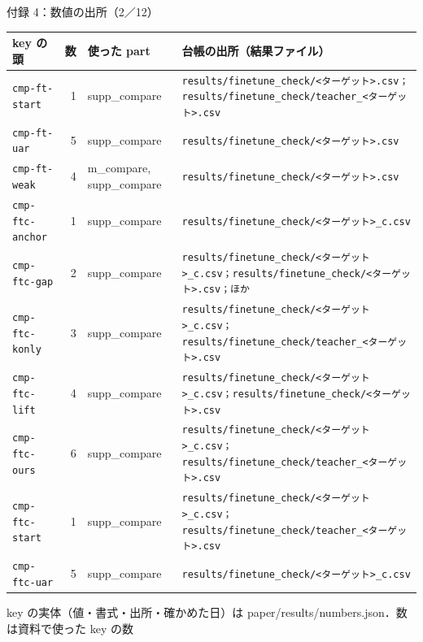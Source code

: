\begin{frame}{付録 4：数値の出所（2／12）}
  \vspace{-0.3em}\centering\tiny\renewcommand{\arraystretch}{1.0}
  \begin{tabularx}{\textwidth}{@{}l r l X@{}}
    \toprule key の頭 & 数 & 使った part & 台帳の出所（結果ファイル） \\ \midrule
    \texttt{cmp-ft-start} & 1 & supp\_compare & \texttt{results/\allowbreak{}finetune\_\allowbreak{}check/\allowbreak{}<ターゲット>.csv；results/\allowbreak{}finetune\_\allowbreak{}check/\allowbreak{}teacher\_\allowbreak{}<ターゲット>.csv} \\
    \texttt{cmp-ft-uar} & 5 & supp\_compare & \texttt{results/\allowbreak{}finetune\_\allowbreak{}check/\allowbreak{}<ターゲット>.csv} \\
    \texttt{cmp-ft-weak} & 4 & m\_compare, supp\_compare & \texttt{results/\allowbreak{}finetune\_\allowbreak{}check/\allowbreak{}<ターゲット>.csv} \\
    \texttt{cmp-ftc-anchor} & 1 & supp\_compare & \texttt{results/\allowbreak{}finetune\_\allowbreak{}check/\allowbreak{}<ターゲット>\_\allowbreak{}c.csv} \\
    \texttt{cmp-ftc-gap} & 2 & supp\_compare & \texttt{results/\allowbreak{}finetune\_\allowbreak{}check/\allowbreak{}<ターゲット>\_\allowbreak{}c.csv；results/\allowbreak{}finetune\_\allowbreak{}check/\allowbreak{}<ターゲット>.csv；ほか} \\
    \texttt{cmp-ftc-konly} & 3 & supp\_compare & \texttt{results/\allowbreak{}finetune\_\allowbreak{}check/\allowbreak{}<ターゲット>\_\allowbreak{}c.csv；results/\allowbreak{}finetune\_\allowbreak{}check/\allowbreak{}teacher\_\allowbreak{}<ターゲット>.csv} \\
    \texttt{cmp-ftc-lift} & 4 & supp\_compare & \texttt{results/\allowbreak{}finetune\_\allowbreak{}check/\allowbreak{}<ターゲット>\_\allowbreak{}c.csv；results/\allowbreak{}finetune\_\allowbreak{}check/\allowbreak{}<ターゲット>.csv} \\
    \texttt{cmp-ftc-ours} & 6 & supp\_compare & \texttt{results/\allowbreak{}finetune\_\allowbreak{}check/\allowbreak{}<ターゲット>\_\allowbreak{}c.csv；results/\allowbreak{}finetune\_\allowbreak{}check/\allowbreak{}teacher\_\allowbreak{}<ターゲット>.csv} \\
    \texttt{cmp-ftc-start} & 1 & supp\_compare & \texttt{results/\allowbreak{}finetune\_\allowbreak{}check/\allowbreak{}<ターゲット>\_\allowbreak{}c.csv；results/\allowbreak{}finetune\_\allowbreak{}check/\allowbreak{}teacher\_\allowbreak{}<ターゲット>.csv} \\
    \texttt{cmp-ftc-uar} & 5 & supp\_compare & \texttt{results/\allowbreak{}finetune\_\allowbreak{}check/\allowbreak{}<ターゲット>\_\allowbreak{}c.csv} \\
    \bottomrule
  \end{tabularx}\par
  {\raggedright\tiny key の実体（値・書式・出所・確かめた日）は paper/results/numbers.json．数は資料で使った key の数\par}
\end{frame}
